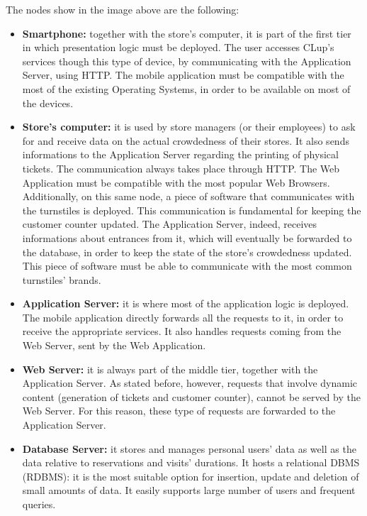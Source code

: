 \documentclass{article}
\begin{document}
The nodes show in the image above are the following:
\begin{itemize}
\item\textbf{Smartphone:} together with the store’s computer, it is part of the first tier in which presentation logic must be deployed. The user accesses CLup’s services though this type of device, by communicating with the Application Server, using HTTP. The mobile application must be compatible with the most of the existing Operating Systems, in order to be available on most of the devices.
\item\textbf{Store’s computer:} it is used by store managers (or their employees) to ask for and receive data on the actual crowdedness of their stores. It also sends informations to the Application Server regarding the printing of physical tickets. The communication always takes place through HTTP. The Web Application must be compatible with the most popular Web Browsers.\\
Additionally, on this same node, a piece of software that communicates with the turnstiles is deployed. This communication is fundamental for keeping the customer counter updated. The Application Server, indeed, receives informations about entrances from it, which will eventually be forwarded to the database, in order to keep the state of the store’s crowdedness updated. This piece of software must be able to communicate with the most common turnstiles’ brands.
\item\textbf{Application Server:} it is where most of the application logic is deployed. The mobile application directly forwards all the requests to it, in order to receive the appropriate services. It also handles requests coming from the Web Server, sent by the Web Application.
\item\textbf{Web Server:} it is always part of the middle tier, together with the Application Server. As stated before, however, requests that involve dynamic content (generation of tickets and customer counter), cannot be served by the Web Server. For this reason, these type of requests are forwarded to the Application Server.
\item\textbf{Database Server:} it stores and manages personal users’ data as well as the data relative to reservations and visits’ durations. It hosts a relational DBMS (RDBMS): it is the most suitable option for insertion, update and deletion of small amounts of data. It easily supports large number of users and frequent queries.
\end{itemize}
\end{document}
